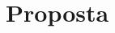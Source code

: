 \documentclass[normaltoc, espacoumemeio, pnumromarab,ruledheader]{abnt}
\begin{document}





\chapter{Proposta}
\end{document}

